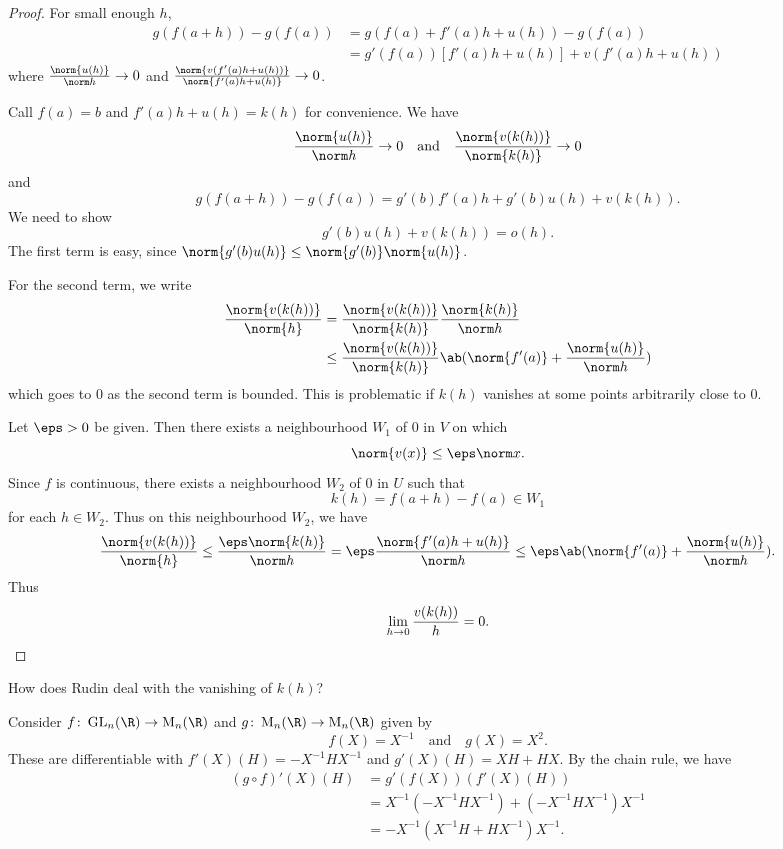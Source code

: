 \begin{proof}
    For small enough $h$, \begin{align*}
        g(f(a + h)) - g(f(a))
            &= g(f(a) + f'(a)h + u(h)) - g(f(a)) \\
            &= g'(f(a))[f'(a)h + u(h)] + v(f'(a)h + u(h))
    \end{align*}
    where $\frac{\norm{u(h)}}{\norm h} \to 0$ and
    $\frac{\norm{v(f'(a)h + u(h))}}{\norm{f'(a)h + u(h)}} \to 0$.

    Call $f(a) = b$ and $f'(a)h + u(h) = k(h)$ for convenience.
    We have \[
        \frac{\norm{u(h)}}{\norm h} \to 0
        \quad \text{and} \quad
        \frac{\norm{v(k(h))}}{\norm{k(h)}} \to 0
    \] and \[
        g(f(a + h)) - g(f(a)) = g'(b)f'(a)h + g'(b)u(h) + v(k(h)).
    \] We need to show \[
        g'(b) u(h) + v(k(h)) = o(h).
    \] The first term is easy, since
    $\norm{g'(b)u(h)} \le \norm{g'(b)} \norm{u(h)}$.

    For the second term, we write \begin{align*}
        \frac{\norm{v(k(h))}}{\norm{h}}
            &= \frac{\norm{v(k(h))}}{\norm{k(h)}}
                \frac{\norm{k(h)}}{\norm h} \\
            &\le \frac{\norm{v(k(h))}}{\norm{k(h)}}
                \ab(\norm{f'(a)} + \frac{\norm{u(h)}}{\norm h})
    \end{align*} which goes to $0$ as the second term is bounded.
    This is problematic if $k(h)$ vanishes at some points
    arbitrarily close to $0$.

    Let $\eps > 0$ be given.
    Then there exists a neighbourhood $W_1$ of $0$ in $V$ on which \[
        \norm{v(x)} \le \eps \norm x.
    \] Since $f$ is continuous, there exists a neighbourhood $W_2$ of $0$
    in $U$ such that \[
        k(h) = f(a + h) - f(a) \in W_1
    \] for each $h \in W_2$.
    Thus on this neighbourhood $W_2$, we have \[
        \frac{\norm{v(k(h))}}{\norm{h}}
        \le \frac{\eps \norm{k(h)}}{\norm h}
        = \eps \frac{\norm{f'(a)h + u(h)}}{\norm h}
        \le \eps \ab(\norm{f'(a)} + \frac{\norm{u(h)}}{\norm h}).
    \] Thus \[
        \lim_{h \to 0} \frac{v(k(h))}{h} = 0. \qedhere
    \]
\end{proof}
How does Rudin deal with the vanishing of $k(h)$?
\begin{example}
    Consider $f\colon \GL_n(\R) \to \M_n(\R)$ and
    $g\colon \M_n(\R) \to \M_n(\R)$ given by \[
        f(X) = X^{-1} \quad \text{and} \quad g(X) = X^2.
    \] These are differentiable with $f'(X)(H) = -X^{-1}HX^{-1}$ and
    $g'(X)(H) = XH + HX$.
    By the chain rule, we have \begin{align*}
        (g \circ f)'(X)(H) &= g'(f(X))(f'(X)(H)) \\
        &= X^{-1}(-X^{-1}HX^{-1}) + (-X^{-1}HX^{-1})X^{-1} \\
        &= -X^{-1}(X^{-1}H + HX^{-1})X^{-1}.
    \end{align*} 
\end{example}

